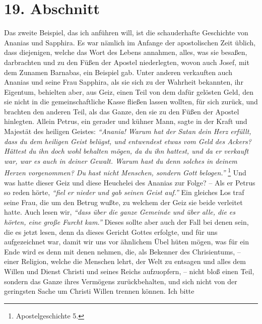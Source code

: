 \section{19. Abschnitt} \label{kap13_ab19}

 Das zweite Beispiel, das ich anführen will, ist die
schauderhafte Geschichte von
Ananias und Sapphira. Es war
nämlich im Anfange der apostolischen Zeit
üblich, dass diejenigen, welche das Wort des Lebens annahmen, alles, was
sie besaßen, darbrachten und zu den Füßen der Apostel niederlegten, wovon auch
Josef, mit dem Zunamen Barnabas, ein Beispiel gab. Unter anderen verkauften auch
Ananias und seine Frau Sapphira, als sie sich zu der Wahrheit bekannten, ihr
Eigentum, behielten aber, aus Geiz, einen Teil von dem dafür gelösten Geld,
den sie nicht in die gemeinschaftliche Kasse fließen lassen wollten, für sich
zurück, und brachten den anderen Teil, als das Ganze, den sie zu den Füßen der
Apostel hinlegten. Allein Petrus, ein gerader und kühner Mann, sagte in der
Kraft und Majestät des heiligen Geistes:
\textit{"`Anania! Warum hat der Satan dein Herz
erfüllt, dass du dem heiligen Geist belügst, und entwendest etwas vom Geld des
Ackers? Hättest du ihn doch wohl behalten mögen, da du ihn hattest, und da er
verkauft war, war es auch in deiner Gewalt. Warum hast du denn solches in deinem
Herzen vorgenommen? Du hast nicht Menschen, sondern Gott belogen."'}
\footnote{Apostelgeschichte 5.}
Und was hatte dieser Geiz und diese Heuchelei des Ananias zur
Folge?
-- Als er Petrus so reden hörte,
\textit{"`fiel er nieder und gab seinen Geist auf."'}
Ein gleiches Los traf seine Frau, die um den Betrug wußte, zu welchem der Geiz
sie beide verleitet hatte. Auch lesen wir,
\textit{"`dass über die ganze Gemeinde und über
alle, die es hörten, eine große Furcht kam."'}
Dieses sollte aber auch der Fall
bei denen sein, die es jetzt lesen, denn da dieses Gericht Gottes
 erfolgte, und
für uns aufgezeichnet war, damit wir uns vor ähnlichem Übel hüten mögen, was
für ein Ende wird es denn mit denen nehmen, die, als Bekenner des
Chrisientums, -- einer Religion,
welche die Menschen lehrt, der Welt zu
entsagen und alles dem Willen und Dienst Christi und
seines Reichs aufzuopfern,
-- nicht bloß einen Teil, sondern das Ganze ihres Vermögens zurückbehalten, und
sich nicht von der geringsten Sache um Christi Willen trennen können. Ich bitte
